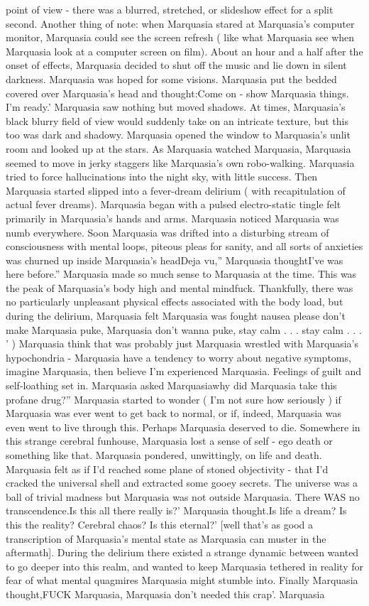 \documentclass[12pt]{book}
\begin{document}
point of view - there was a blurred, stretched, or slideshow effect for a split second. Another thing of note: when Marquasia stared at Marquasia's computer monitor, Marquasia could see the screen refresh ( like what Marquasia see when Marquasia look at a computer screen on film). About an hour and a half after the onset of effects, Marquasia decided to shut off the music and lie down in silent darkness. Marquasia was hoped for some visions. Marquasia put the bedded covered over Marquasia's head and thought:Come on - show Marquasia things. I'm ready.' Marquasia saw nothing but moved shadows. At times, Marquasia's black blurry field of view would suddenly take on an intricate texture, but this too was dark and shadowy. Marquasia opened the window to Marquasia's unlit room and looked up at the stars. As Marquasia watched Marquasia, Marquasia seemed to move in jerky staggers like Marquasia's own robo-walking. Marquasia tried to force hallucinations into the night sky, with little success. Then Marquasia started slipped into a fever-dream delirium ( with recapitulation of actual fever dreams). Marquasia began with a pulsed electro-static tingle felt primarily in Marquasia's hands and arms. Marquasia noticed Marquasia was numb everywhere. Soon Marquasia was drifted into a disturbing stream of consciousness with mental loops, piteous pleas for sanity, and all sorts of anxieties was churned up inside Marquasia's headDeja vu,'' Marquasia thoughtI've was here before.'' Marquasia made so much sense to Marquasia at the time. This was the peak of Marquasia's body high and mental mindfuck. Thankfully, there was no particularly unpleasant physical effects associated with the body load, but during the delirium, Marquasia felt Marquasia was fought nausea please don't make Marquasia puke, Marquasia don't wanna puke, stay calm . . .  stay calm . . . ' ) Marquasia think that was probably just Marquasia wrestled with Marquasia's hypochondria - Marquasia have a tendency to worry about negative symptoms, imagine Marquasia, then believe I'm experienced Marquasia. Feelings of guilt and self-loathing set in. Marquasia asked Marquasiawhy did Marquasia take this profane drug?'' Marquasia started to wonder ( I'm not sure how seriously ) if Marquasia was ever went to get back to normal, or if, indeed, Marquasia was even went to live through this. Perhaps Marquasia deserved to die. Somewhere in this strange cerebral funhouse, Marquasia lost a sense of self - ego death or something like that. Marquasia pondered, unwittingly, on life and death. Marquasia felt as if I'd reached some plane of stoned objectivity - that I'd cracked the universal shell and extracted some gooey secrets. The universe was a ball of trivial madness but Marquasia was not outside Marquasia. There WAS no transcendence.Is this all there really is?' Marquasia thought.Is life a dream? Is this the reality? Cerebral chaos? Is this eternal?' [well that's as good a transcription of Marquasia's mental state as Marquasia can muster in the aftermath]. During the delirium there existed a strange dynamic between wanted to go deeper into this realm, and wanted to keep Marquasia tethered in reality for fear of what mental quagmires Marquasia might stumble into. Finally Marquasia thought,FUCK Marquasia, Marquasia don't needed this crap'. Marquasia 
\end{document}
